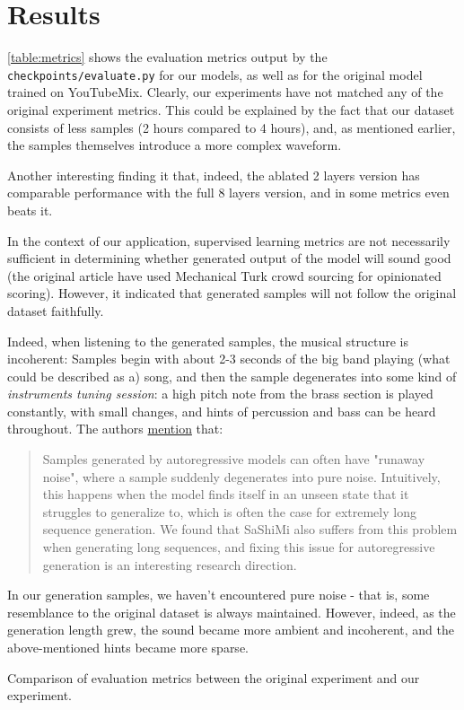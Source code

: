 \documentclass[12pt]{article}
\begin{document}
\section{Results}
\autoref{table:metrics} shows the evaluation metrics output by the \texttt{checkpoints/evaluate.py} for our models, as well as for the original model trained on YouTubeMix. Clearly, our experiments have not matched any of the original experiment metrics. This could be explained by the fact that our dataset consists of less samples (2 hours compared to 4 hours), and, as mentioned earlier, the samples themselves introduce a more complex waveform. 

Another interesting finding it that, indeed, the ablated 2 layers version has comparable performance with the full 8 layers version, and in some metrics even beats it. 

In the context of our application, supervised learning metrics are not necessarily sufficient in determining whether generated output of the model will sound good (the original article have used Mechanical Turk crowd sourcing for opinionated scoring). However, it indicated that generated samples will not follow the original dataset faithfully.

Indeed, when listening to the generated samples, the musical structure is incoherent: Samples begin with about 2-3 seconds of the big band playing (what could be described as a) song, and then the sample degenerates into some kind of \textit{instruments tuning session}: a high pitch note from the brass section is played constantly, with small changes, and hints of percussion and bass can be heard throughout. The authors \href{https://github.com/galbezalel/s4-dl-workshop/tree/main/models/sashimi#unconditional-generation}{mention} that:
\begin{quotation}
    Samples generated by autoregressive models can often have "runaway noise", where a sample suddenly degenerates into pure noise. Intuitively, this happens when the model finds itself in an unseen state that it struggles to generalize to, which is often the case for extremely long sequence generation. We found that SaShiMi also suffers from this problem when generating long sequences, and fixing this issue for autoregressive generation is an interesting research direction.
\end{quotation}
In our generation samples, we haven't encountered pure noise - that is, some resemblance to the original dataset is always maintained. However, indeed, as the generation length grew, the sound became more ambient and incoherent, and the above-mentioned hints became more sparse.
\begin{table}
    \caption{Comparison of evaluation metrics between the original experiment and our experiment.}
    \label{table:metrics}
\end{table}
\end{document}
